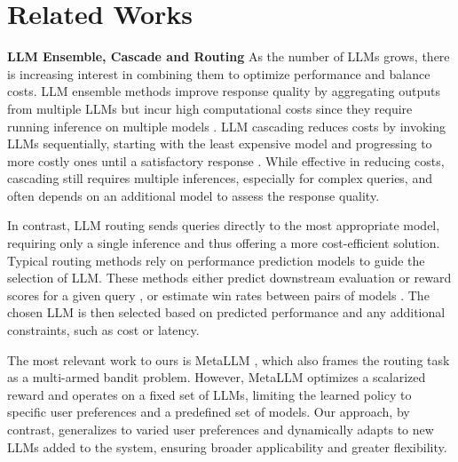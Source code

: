 \section{Related Works}
\textbf{LLM Ensemble, Cascade and Routing}\quad
As the number of LLMs grows, there is increasing interest in combining them to optimize performance and balance costs. LLM ensemble methods improve response quality by aggregating outputs from multiple LLMs but incur high computational costs since they require running inference on multiple models \citep{jiang2023llm,wang2023fusing,lu2024blending}. LLM cascading reduces costs by invoking LLMs sequentially, starting with the least expensive model and progressing to more costly ones until a satisfactory response \citep{chen2023frugalgpt,madaan2023automix,ramirez2024optimising}. While effective in reducing costs, cascading still requires multiple inferences, especially for complex queries, and often depends on an additional model to assess the response quality. 

In contrast, LLM routing sends queries directly to the most appropriate model, requiring only a single inference and thus offering a more cost-efficient solution. Typical routing methods rely on performance prediction models to guide the selection of LLM. These methods either predict downstream evaluation or reward scores for a given query \citep{shnitzer2023large,lu2023routing,hari2023tryage,vsakota2024fly}, or estimate win rates between pairs of models \citep{ding2024hybrid,ong2024routellm}. The chosen LLM is then selected based on predicted performance and any additional constraints, such as cost or latency. 

The most relevant work to ours is MetaLLM \citep{nguyen2024metallm}, which also frames the routing task as a multi-armed bandit problem. However, MetaLLM optimizes a scalarized reward and operates on a fixed set of LLMs, limiting the learned policy to specific user preferences and a predefined set of models. Our approach, by contrast, generalizes to varied user preferences and dynamically adapts to new LLMs added to the system, ensuring broader applicability and greater flexibility.

